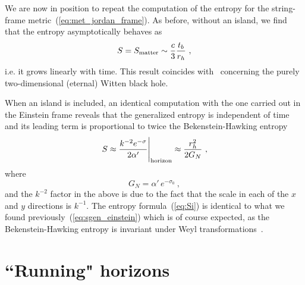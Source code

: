 \documentclass[a4paper, 12pt]{article}
\def\a{\alpha}
\def\s{\sigma}
\def\be{\begin{equation}}
\def\ee{\end{equation}}
\begin{document}
We are now in position to repeat the computation of the entropy for the string-frame metric~(\ref{eq:met_jordan_frame}). As before, without an island, we find that the entropy 
asymptotically behaves as 
\be
\label{eq:Sw}
S=S_{\rm matter} \sim \frac{c}{3} \frac{t_b}{r_h}  \ , 
\ee
i.e. it grows linearly with time.  This result coincides with~\cite{Gautason:2020tmk,Anegawa:2020ezn} concerning the purely two-dimensional (eternal) Witten black hole.

When an island is included, an identical computation with the one carried out in the Einstein frame reveals that the generalized entropy is independent of time and its leading term is proportional to twice the Bekenstein-Hawking entropy
\be
\label{eq:Si}
S\approx\frac{k^{-2}e^{-\s}}{2\a'}\Bigg\vert_{\rm horizon} \approx\frac{r_h^2}{2 G_N}\ , 
\ee
where 
\be
G_N=\alpha'\,e^{-\s_0}\ ,
\label{GN}
\ee
and the $k^{-2}$ factor in the above is due to the fact that the scale in each of the $x$ and $y$ directions is $k^{-1}$.  The entropy formula~(\ref{eq:Si}) is identical to what we found previously~(\ref{eq:sgen_einstein}) which is of course expected, as the Bekenstein-Hawking entropy is invariant under Weyl transformations~\cite{BH2}. 


\section{``Running" horizons}
\label{sec:running}
\end{document}
